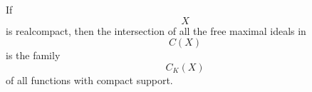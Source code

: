 If $$X$$ is realcompact, then the intersection of all the free maximal ideals in $$C(X)$$ is the family $$C_K(X)$$ of all functions with compact support.
